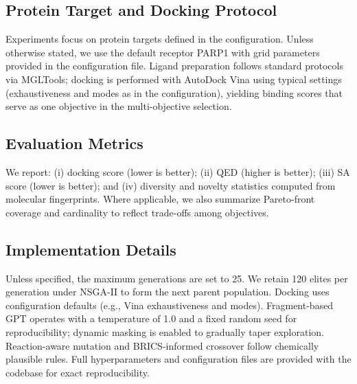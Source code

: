 \documentclass[lettersize,journal]{IEEEtran}
\begin{document}
\subsection{Protein Target and Docking Protocol}
Experiments focus on protein targets defined in the configuration. Unless otherwise stated, we use the default receptor PARP1 with grid parameters provided in the configuration file. Ligand preparation follows standard protocols via MGLTools; docking is performed with AutoDock Vina using typical settings (exhaustiveness and modes as in the configuration), yielding binding scores that serve as one objective in the multi-objective selection.
\subsection{Evaluation Metrics}
We report: (i) docking score (lower is better); (ii) QED (higher is better); (iii) SA score (lower is better); and (iv) diversity and novelty statistics computed from molecular fingerprints. Where applicable, we also summarize Pareto-front coverage and cardinality to reflect trade-offs among objectives.
\subsection{Implementation Details}
Unless specified, the maximum generations are set to 25. We retain 120 elites per generation under NSGA-II to form the next parent population. Docking uses configuration defaults (e.g., Vina exhaustiveness and modes). Fragment-based GPT operates with a temperature of 1.0 and a fixed random seed for reproducibility; dynamic masking is enabled to gradually taper exploration. Reaction-aware mutation and BRICS-informed crossover follow chemically plausible rules. Full hyperparameters and configuration files are provided with the codebase for exact reproducibility.


\end{document}
